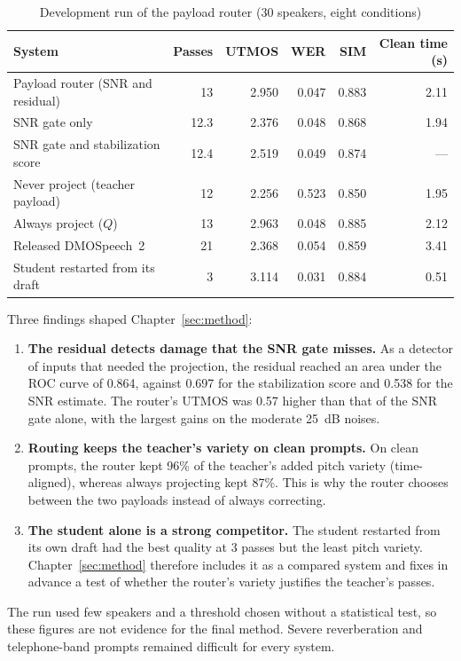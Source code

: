\begin{table}[!htbp]
\centering\small
\caption{Development run of the payload router (30 speakers, eight conditions)}
\label{tab:snr-r-overall}
\setlength{\tabcolsep}{4pt}
\begin{tabular}{@{}l r r r r r@{}}
\toprule
\textbf{System} & \textbf{Passes} & \textbf{UTMOS} & \textbf{WER} & \textbf{SIM} & \textbf{Clean time (s)} \\
\midrule
Payload router (SNR and residual) & 13 & 2.950 & 0.047 & 0.883 & 2.11 \\
SNR gate only & 12.3 & 2.376 & 0.048 & 0.868 & 1.94 \\
SNR gate and stabilization score & 12.4 & 2.519 & 0.049 & 0.874 & --- \\
Never project (teacher payload) & 12 & 2.256 & 0.523 & 0.850 & 1.95 \\
Always project ($Q$) & 13 & 2.963 & 0.048 & 0.885 & 2.12 \\
Released DMOSpeech~2 & 21 & 2.368 & 0.054 & 0.859 & 3.41 \\
Student restarted from its draft & 3 & 3.114 & 0.031 & 0.884 & 0.51 \\
\bottomrule
\end{tabular}
\end{table}

Three findings shaped Chapter~\ref{sec:method}:
\begin{enumerate}[leftmargin=1.4em]
\item \textbf{The residual detects damage that the SNR gate misses.} As a detector of inputs that needed the projection, the residual reached an area under the ROC curve of 0.864, against 0.697 for the stabilization score and 0.538 for the SNR estimate. The router's UTMOS was 0.57 higher than that of the SNR gate alone, with the largest gains on the moderate 25~dB noises.
\item \textbf{Routing keeps the teacher's variety on clean prompts.} On clean prompts, the router kept 96\% of the teacher's added pitch variety (time-aligned), whereas always projecting kept 87\%. This is why the router chooses between the two payloads instead of always correcting.
\item \textbf{The student alone is a strong competitor.} The student restarted from its own draft had the best quality at 3 passes but the least pitch variety. Chapter~\ref{sec:method} therefore includes it as a compared system and fixes in advance a test of whether the router's variety justifies the teacher's passes.
\end{enumerate}
The run used few speakers and a threshold chosen without a statistical test, so these figures are not evidence for the final method. Severe reverberation and telephone-band prompts remained difficult for every system.

\FloatBarrier
